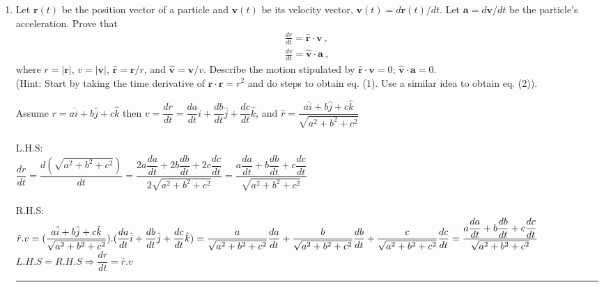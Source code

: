 \documentclass[fleqn]{article}
\begin{document}
  \begin{enumerate}
    \item Let $\mathbf{r}(t)$ be the position vector of a particle and $\mathbf{v}(t)$ be its velocity vector, $\mathbf{v}(t) = d\mathbf{r}(t)/dt$. Let $\mathbf{a} = d\mathbf{v}/dt$ be the particle's acceleration. Prove that
      \begin{eqnarray}
      \frac{dr}{dt}=\mathbf{\hat{r}}\cdot \mathbf{v}~,  \\
      \frac{dv}{dt}=\mathbf{\hat{v}}\cdot \mathbf{a}~,  
      \end{eqnarray}
      where $r = |\mathbf{r}|$, $v = |\mathbf{v} |$, $\mathbf{\hat{r}}=\mathbf{r}/r$, and $\mathbf{\hat{v}}=\mathbf{v}/v$.   Describe the motion stipulated by $\mathbf{\hat{r}}\cdot \mathbf{v} = 0$; $\mathbf{\hat{v}}\cdot \mathbf{a}=0$.\\
      (Hint: Start by taking the time derivative of $\mathbf{r}\cdot \mathbf{r}=r^2$ and do steps to obtain eq. (1). Use a similar idea to obtain eq. (2)).

      \textcolor{hwColor}{
        Assume $r=a \hat{i}+b \hat{j}+c \hat{k} $ then $ v=\dfrac{dr}{dt}=\dfrac{da}{dt}\hat{i}+\dfrac{db}{dt}\hat{j}+\dfrac{dc}{dt}\hat{k}$, and $\hat{r}=\dfrac{a \hat{i}+b \hat{j}+c \hat{k}}{\sqrt{a^2+b^2+c^2}}$ \\
        \\
        L.H.S: \\
        $
          \dfrac{dr}{dt}=\dfrac{d(\sqrt{a^2+b^2+c^2})}{dt}=\dfrac{2a\dfrac{da}{dt}+2b\dfrac{db}{dt}+2c\dfrac{dc}{dt}}{2\sqrt{a^2+b^2+c^2}}=\dfrac{a\dfrac{da}{dt}+b\dfrac{db}{dt}+c\dfrac{dc}{dt}}{\sqrt{a^2+b^2+c^2}}
        $
        \\
        \\
        R.H.S: \\
        $
          \hat{r}.v=(\dfrac{a \hat{i}+b \hat{j}+c \hat{k}}{\sqrt{a^2+b^2+c^2}}).(\dfrac{da}{dt}\hat{i}+\dfrac{db}{dt}\hat{j}+\dfrac{dc}{dt}\hat{k})=\dfrac{a}{\sqrt{a^2+b^2+c^2}}\dfrac{da}{dt}+\dfrac{b}{\sqrt{a^2+b^2+c^2}}\dfrac{db}{dt}+\dfrac{c}{\sqrt{a^2+b^2+c^2}}\dfrac{dc}{dt} \\
          \\
          =\dfrac{a\dfrac{da}{dt}+b\dfrac{db}{dt}+c\dfrac{dc}{dt}}{\sqrt{a^2+b^2+c^2}} \\
        $
        \\
        $L.H.S=R.H.S \Rightarrow \dfrac{dr}{dt}=\hat{r}.v$
      }

      \textcolor{hwColor}{
        \rule{15cm}{1pt}
      }


\end{enumerate}
\end{document}
